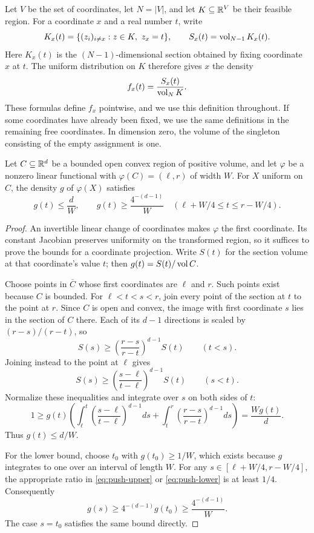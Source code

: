 Let $V$ be the set of coordinates,
let $N=|V|$, and let
$K\subseteq\mathbb R^V$ be their feasible region.
For a coordinate $x$ and a real number $t$, write
\[
K_x(t)=\{(z_i)_{i\ne x}:z\in K,\ z_x=t\},
\qquad S_x(t)=\vol_{N-1}K_x(t).
\]
Here $K_x(t)$ is the $(N-1)$-dimensional section obtained by fixing
coordinate $x$ at $t$. The uniform distribution on $K$
therefore gives $x$ the density
\[
f_x(t)=\frac{S_x(t)}{\operatorname{vol}_N K}.
\]
These formulas define $f_x$ pointwise, and we use this definition throughout.
If some coordinates have already been fixed, we use the same
definitions in the remaining free coordinates. In dimension zero, the
volume of the singleton consisting of the empty assignment is one.

\begin{lemma}\label{lem:projection-density}
Let $C\subseteq\mathbb R^d$ be a bounded open convex region of positive volume,
and let $\varphi$ be a nonzero linear functional with
$\varphi(C)=(\ell,r)$ of width $W$. For $X$ uniform on $C$, the density
$g$ of $\varphi(X)$ satisfies
\[
g(t)\le\frac dW,\qquad
g(t)\ge\frac{4^{-(d-1)}}W
\quad(\ell+W/4\le t\le r-W/4).
\]
\end{lemma}
\begin{proof}
An invertible linear change of coordinates makes $\varphi$ the first
coordinate. Its constant Jacobian preserves uniformity on the transformed
region, so it suffices to prove the bounds for a coordinate projection.
Write $S(t)$ for the section volume at that coordinate's value $t$;
then $g(t)=S(t)/\operatorname{vol} C$.

Choose points in $\overline C$ whose first coordinates are $\ell$ and $r$.
Such points exist because $C$ is bounded. For $\ell<t<s<r$, join every
point of the section at $t$ to the point at $r$. Since $C$ is open and
convex, the image with first coordinate $s$ lies in the section of $C$ there. Each of its
$d-1$ directions is scaled by $(r-s)/(r-t)$, so
\begin{equation}\label{eq:push-upper}
S(s)\ge\left(\frac{r-s}{r-t}\right)^{d-1}S(t)
\qquad(t<s).
\end{equation}
Joining instead to the point at $\ell$ gives
\begin{equation}\label{eq:push-lower}
S(s)\ge\left(\frac{s-\ell}{t-\ell}\right)^{d-1}S(t)
\qquad(s<t).
\end{equation}
Normalize these inequalities and integrate over $s$ on both sides of $t$:
\[
1\ge g(t)\left(
\int_\ell^t\left(\frac{s-\ell}{t-\ell}\right)^{d-1}ds+
\int_t^r\left(\frac{r-s}{r-t}\right)^{d-1}ds\right)
=\frac{Wg(t)}{d}.
\]
Thus $g(t)\le d/W$.

For the lower bound, choose $t_0$ with $g(t_0)\ge1/W$, which exists
because $g$ integrates to one over an interval of length $W$. For any
$s\in[\ell+W/4,r-W/4]$, the appropriate ratio in
\eqref{eq:push-upper} or \eqref{eq:push-lower} is at least $1/4$.
Consequently
\[
g(s)\ge4^{-(d-1)}g(t_0)\ge\frac{4^{-(d-1)}}{W}.
\]
The case $s=t_0$ satisfies the same bound directly.
\end{proof}


